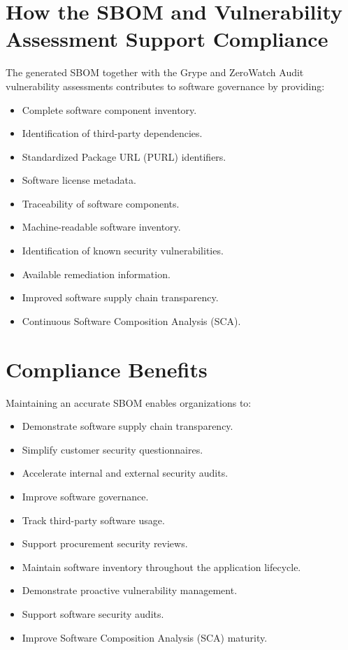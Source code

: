 \section{How the SBOM and Vulnerability Assessment Support Compliance}
The generated SBOM together with the Grype and ZeroWatch Audit vulnerability assessments contributes to software governance by providing:
\begin{itemize}
\item Complete software component inventory.
\item Identification of third-party dependencies.
\item Standardized Package URL (PURL) identifiers.
\item Software license metadata.
\item Traceability of software components.
\item Machine-readable software inventory.
\item Identification of known security vulnerabilities.
\item Available remediation information.
\item Improved software supply chain transparency.
\item Continuous Software Composition Analysis (SCA).
\end{itemize}

\vspace{0.4cm}


\section{Compliance Benefits}

Maintaining an accurate SBOM enables organizations to:
\begin{itemize}
\item Demonstrate software supply chain transparency.
\item Simplify customer security questionnaires.
\item Accelerate internal and external security audits.
\item Improve software governance.
\item Track third-party software usage.
\item Support procurement security reviews.
\item Maintain software inventory throughout the application lifecycle.
\item Demonstrate proactive vulnerability management.
\item Support software security audits.
\item Improve Software Composition Analysis (SCA) maturity.
\end{itemize}

